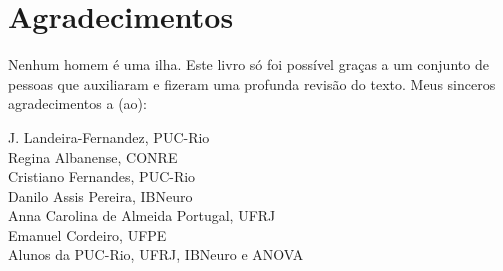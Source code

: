\documentclass[
]{book}
\begin{document}
\hypertarget{agradecimentos}{%
\section{Agradecimentos}\label{agradecimentos}}

Nenhum homem é uma ilha. Este livro só foi possível graças a um conjunto de pessoas que auxiliaram e fizeram uma profunda revisão do texto. Meus sinceros agradecimentos a (ao):

J. Landeira-Fernandez, PUC-Rio\\
Regina Albanense, CONRE\\
Cristiano Fernandes, PUC-Rio\\
Danilo Assis Pereira, IBNeuro\\
Anna Carolina de Almeida Portugal, UFRJ\\
Emanuel Cordeiro, UFPE\\
Alunos da PUC-Rio, UFRJ, IBNeuro e ANOVA

  
\end{document}
